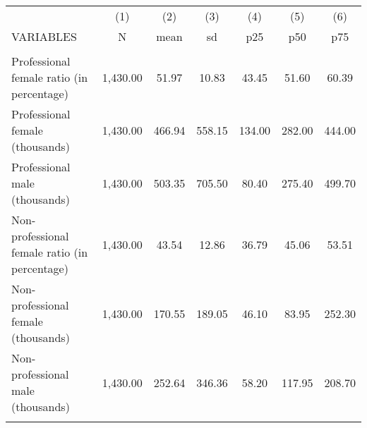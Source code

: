 \begin{tabular}{lcccccc} \hline
 & (1) & (2) & (3) & (4) & (5) & (6) \\
VARIABLES & N & mean & sd & p25 & p50 & p75 \\ \hline
 &  &  &  &  &  &  \\
Professional female ratio (in percentage) & 1,430.00 & 51.97 & 10.83 & 43.45 & 51.60 & 60.39 \\
Professional female (thousands) & 1,430.00 & 466.94 & 558.15 & 134.00 & 282.00 & 444.00 \\
Professional male (thousands) & 1,430.00 & 503.35 & 705.50 & 80.40 & 275.40 & 499.70 \\
Non-professional female ratio (in percentage) & 1,430.00 & 43.54 & 12.86 & 36.79 & 45.06 & 53.51 \\
Non-professional female (thousands) & 1,430.00 & 170.55 & 189.05 & 46.10 & 83.95 & 252.30 \\
Non-professional male (thousands) & 1,430.00 & 252.64 & 346.36 & 58.20 & 117.95 & 208.70 \\
 &  &  &  &  &  &  \\ \hline
\end{tabular}
